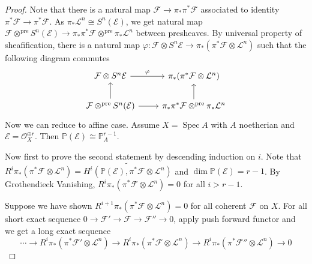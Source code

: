 \documentclass{ctexart}
\newcommand{\spec}{\operatorname{Spec}}
\begin{document}
\begin{proof}
    Note that there is a natural map $\mathcal{F} \rightarrow \pi_{\ast}\pi^{\ast}\mathcal{F}$ associated to identity $\pi^{\ast}\mathcal{F} \rightarrow \pi^{\ast}\mathcal{F}$.
    As $\pi_{\ast}\mathcal{L}^{n} \cong S^{n}(\mathcal{E})$, we get natural map $\mathcal{F} \otimes^{\text{pre}} S^{n}(\mathcal{E}) \rightarrow \pi_{\ast}\pi^{\ast}\mathcal{F} \otimes^{\text{pre}} \pi_{\ast}\mathcal{L}^{n}$ between presheaves.
    By universal property of sheafification, there is a natural map $\varphi: \mathcal{F} \otimes S^{n}\mathcal{E} \rightarrow \pi_{\ast}(\pi^{\ast}\mathcal{F} \otimes \mathcal{L}^{n})$ such that the following diagram commutes
    \begin{equation}
        \begin{tikzcd}
            \mathcal{F} \otimes S^{n}\mathcal{E} \arrow[r, "\varphi"] &
            \pi_{\ast}(\pi^{\ast}\mathcal{F} \otimes \mathcal{L}^{n}) \\
            \mathcal{F} \otimes^{\text{pre}} S^{n}(\mathcal{E}) \arrow[u] \arrow[r] &
            \pi_{\ast}\pi^{\ast}\mathcal{F} \otimes^{\text{pre}} \pi_{\ast}\mathcal{L}^{n} \arrow[u]
        \end{tikzcd}
    \end{equation}
    Now we can reduce to affine case.
    Assume $X = \spec A$ with $A$ noetherian and $\mathcal{E} = \mathcal{O}_{X}^{\oplus r}$.
    Then $\mathbb{P}(\mathcal{E}) \cong \mathbb{P}_{A}^{r - 1}$.
    \par
    Now first to prove the second statement by descending induction on $i$.
    Note that $R^{i}\pi_{\ast}(\pi^{\ast}\mathcal{F} \otimes \mathcal{L}^{n}) = \widetilde{H^{i}(\mathbb{P}(\mathcal{E}), \pi^{\ast}\mathcal{F} \otimes \mathcal{L}^{n})}$ and $\dim \mathbb{P}(\mathcal{E}) = r - 1$.
    By Grothendieck Vanishing, $R^{i}\pi_{\ast}(\pi^{\ast}\mathcal{F} \otimes \mathcal{L}^{n}) = 0$ for all $i > r - 1$.
    \par
    Suppose we have shown $R^{i + 1}\pi_{\ast}(\pi^{\ast}\mathcal{F} \otimes \mathcal{L}^{n}) = 0$ for all coherent $\mathcal{F}$ on $X$.
    For all short exact sequence $0 \rightarrow \mathcal{F}' \rightarrow \mathcal{F} \rightarrow \mathcal{F}'' \rightarrow 0$,
    apply push forward functor and we get a long exact sequence
    \begin{equation}
        \cdots \longrightarrow R^{i}\pi_{\ast}(\pi^{\ast}\mathcal{F}' \otimes \mathcal{L}^{n}) \longrightarrow R^{i}\pi_{\ast}(\pi^{\ast}\mathcal{F} \otimes \mathcal{L}^{n}) \longrightarrow R^{i}\pi_{\ast}(\pi^{\ast}\mathcal{F}'' \otimes \mathcal{L}^{n}) \longrightarrow 0

\end{equation}
\end{proof}
\end{document}
